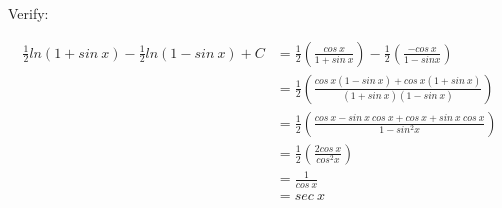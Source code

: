 \documentclass[9pt]{article}
\begin{document}
Verify:

\begin{align*}
  \frac{1}{2} ln(1 + sin \ x) - \frac{1}{2} ln(1 - sin \ x) + C &= \frac{1}{2} (\frac{cos \ x}{1 + sin \ x}) - \frac{1}{2} (\frac{- cos \ x}{1 - sin x}) \\
  &= \frac{1}{2} (\frac{cos \ x (1 - sin \ x) + cos \ x (1 + sin \ x)}{(1 + sin \ x)(1 - sin \ x)}) \\
  &= \frac{1}{2} (\frac{cos \ x - sin \ x \ cos \ x + cos \ x + sin \ x \ cos \ x}{1 - sin^2 x}) \\
  &= \frac{1}{2} (\frac{2 cos \ x}{cos^2 x}) \\
  &= \frac{1}{cos \ x} \\
  &= sec \ x
\end{align*}
\end{document}
